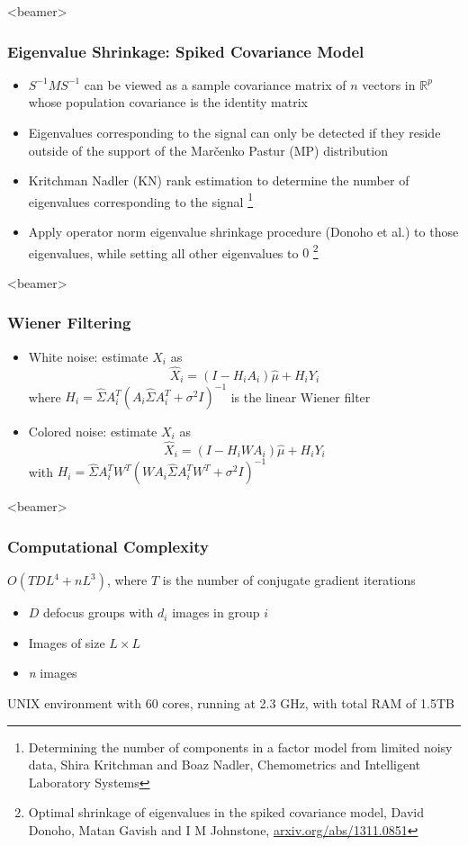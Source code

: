 \documentclass{beamer}
\begin{document}
\begin{frame}<beamer>
\frametitle{Eigenvalue Shrinkage: Spiked Covariance Model}
\begin{itemize}[<+->]
\item $S^{-1}MS^{-1}$ can be viewed as a sample covariance matrix of
$n$ vectors in $ \mathbb{R}^p$ whose population covariance is the identity matrix
\item Eigenvalues corresponding to the signal 
can only be detected if they reside outside of the support of the  Mar\v{c}enko Pastur (MP)
distribution
\item Kritchman Nadler (KN) rank estimation to determine the number of eigenvalues 
corresponding to the signal \footnote{\tiny{Determining the number of components in a factor model from limited noisy data, Shira Kritchman and Boaz Nadler,
Chemometrics and Intelligent Laboratory Systems}}
\item Apply operator norm eigenvalue 
shrinkage procedure (Donoho et al.) to those eigenvalues, while setting all other eigenvalues to 
$0$ \footnote{\tiny{Optimal shrinkage of eigenvalues in the spiked covariance model,  David Donoho, Matan Gavish and I M Johnstone,
\url{arxiv.org/abs/1311.0851}}}
\end{itemize}

\end{frame}


\begin{frame}<beamer>
\frametitle{Wiener Filtering}

\begin{itemize}
\item White noise: estimate $X_i$ as
\begin{equation}
\hat X_i = (I-H_iA_{i})\hat\mu + H_iY_i 
\end{equation}
where $H_i = \hat \Sigma A_{i}^T ( A_{i} \hat \Sigma A_{i}^T + \sigma^2 
I)^{-1} $ is the linear Wiener filter  
\item Colored noise: estimate $X_i$ as
\begin{equation}
\hat X_i = (I-H_iWA_{i})\hat\mu + H_iY_i 
\end{equation}
with $H_i = \hat \Sigma A_{i}^T W^T (W A_{i} \hat \Sigma A_{i}^T W^T 
+ \sigma^2 I)^{-1}$
\end{itemize}
\end{frame}

\begin{frame}<beamer>
\frametitle{Computational Complexity}
$O(TDL^4 + nL^3)$, where $T$ is the number of conjugate gradient iterations
\begin{itemize}
\item $D$ defocus groups with $d_i$ images in group $i$
\item Images of size $L \times L$
\item \textit{n} images
\end{itemize}
UNIX environment with 60 cores,
running at 2.3 GHz, with total RAM of 1.5TB

\end{frame}
\end{document}
